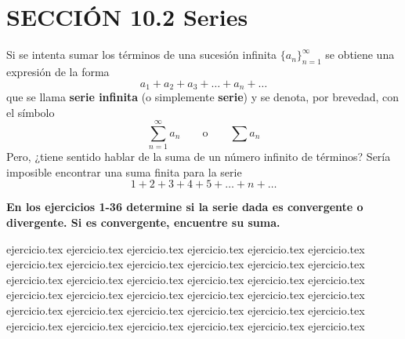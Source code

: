 
\section*{SECCIÓN 10.2 \quad Series}

Si se intenta sumar los términos de una sucesión infinita $\{a_n\}_{n=1}^\infty$ se obtiene una expresión de la forma
\begin{equation}
    a_1 + a_2 + a_3 + \dots + a_n + \dots \tag{10.12}
\end{equation}
que se llama \textbf{serie infinita} (o simplemente \textbf{serie}) y se denota, por brevedad, con el símbolo
\[ \sum_{n=1}^\infty a_n \qquad \text{o} \qquad \sum a_n \]
Pero, ¿tiene sentido hablar de la suma de un número infinito de términos? Sería imposible encontrar una suma finita para la serie
\[ 1 + 2 + 3 + 4 + 5 + \dots + n + \dots \]

\vspace{0.5cm}
\noindent\textbf{En los ejercicios 1-36 determine si la serie dada es convergente o divergente. Si es convergente, encuentre su suma.}
\begin{enumerate}
    {ejercicio.tex}
{ejercicio.tex}
{ejercicio.tex}
{ejercicio.tex}
{ejercicio.tex}
{ejercicio.tex}
{ejercicio.tex}
{ejercicio.tex}
{ejercicio.tex}
{ejercicio.tex}
{ejercicio.tex}
{ejercicio.tex}
{ejercicio.tex}
{ejercicio.tex}
{ejercicio.tex}
{ejercicio.tex}
{ejercicio.tex}
{ejercicio.tex}
{ejercicio.tex}
{ejercicio.tex}
{ejercicio.tex}
{ejercicio.tex}
{ejercicio.tex}
{ejercicio.tex}
{ejercicio.tex}
{ejercicio.tex}
{ejercicio.tex}
{ejercicio.tex}
{ejercicio.tex}
{ejercicio.tex}
{ejercicio.tex}
{ejercicio.tex}
{ejercicio.tex}
{ejercicio.tex}
{ejercicio.tex}
{ejercicio.tex}
\end{enumerate}

